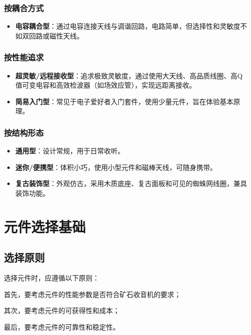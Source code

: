 \documentclass[12pt,UTF8]{ctexbook}
\begin{document}
\subsubsection{按耦合方式}
\begin{itemize}[leftmargin=3.5em]
	\item \textbf{电容耦合型}：通过电容连接天线与调谐回路，电路简单，但选择性和灵敏度不如双回路或磁性天线。
\end{itemize}

\subsubsection{按性能追求}
\begin{itemize}[leftmargin=3.5em]
	\item \textbf{超灵敏/远程接收型}：追求极致灵敏度，通过使用大天线、高品质线圈、高Q值可变电容和高效检波器（如场效应管），实现远距离接收。
	\item \textbf{简易入门型}：常见于电子爱好者入门套件，使用少量元件，旨在体验基本原理。
\end{itemize}

\subsubsection{按结构形态}
\begin{itemize}[leftmargin=3.5em]
	\item \textbf{通用型}：设计常规，用于日常收听。
	\item \textbf{迷你/便携型}：体积小巧，使用小型元件和磁棒天线，可随身携带。
	\item \textbf{复古装饰型}：外观仿古，采用木质底座、复古面板和可见的蜘蛛网线圈，兼具装饰功能。
\end{itemize}

\section{元件选择基础}

\subsection{选择原则}

选择元件时，应遵循以下原则：

首先，要考虑元件的性能参数是否符合矿石收音机的要求；

其次，要考虑元件的可获得性和成本；

最后，要考虑元件的可靠性和稳定性。
\end{document}
